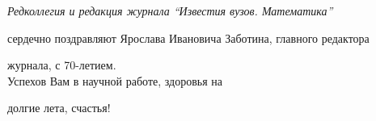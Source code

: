 


\newcommand{\tl}[3]{\medskip\noindent{\bf#1}\ #2 \dotfill #3 \par} 

\pagestyle{empty}





\phantom{a}

\bigskip



\bigskip



\bigskip



\bigskip



\bigskip



\vspace{5cm}



\begin{center}



{\it Редколлегия и редакция журнала ``Известия вузов. Математика''

сердечно поздравляют Ярослава Ивановича Заботина, главного редактора

журнала, с 70-летием.\\ Успехов Вам в научной работе, здоровья на

долгие лета, счастья!}



\end{center}





